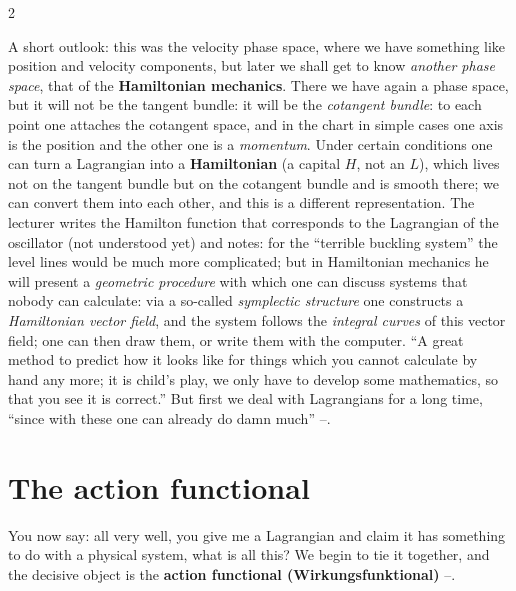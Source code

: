 \begin{paracol}{2}
\begin{aside}\label{as:lag-hamilton}
A short outlook: this was the velocity phase space, where we have something like position and velocity components, but later we shall get to know \emph{another phase space}, that of the \textbf{Hamiltonian mechanics}. There we have again a phase space, but it will not be the tangent bundle: it will be the \emph{cotangent bundle}: to each point one attaches the cotangent space, and in the chart in simple cases one axis is the position and the other one is a \emph{momentum}. Under certain conditions one can turn a Lagrangian into a \textbf{Hamiltonian} (a capital $H$, not an $L$), which lives not on the tangent bundle but on the cotangent bundle and is smooth there; we can convert them into each other, and this is a different representation.
The lecturer writes the Hamilton function that corresponds to the Lagrangian of the oscillator (not understood yet) and notes: for the ``terrible buckling system'' the level lines would be much more complicated; but in Hamiltonian mechanics he will present a \emph{geometric procedure} with which one can discuss systems that nobody can calculate: via a so-called \emph{symplectic structure} one constructs a \emph{Hamiltonian vector field}, and the system follows the \emph{integral curves} of this vector field; one can then draw them, or write them with the computer. ``A great method to predict how it looks like for things which you cannot calculate by hand any more; it is child's play, we only have to develop some mathematics, so that you see it is correct.'' But first we deal with Lagrangians for a long time, ``since with these one can already do damn much'' --.
\end{aside}

\section{The action functional}\label{sec:lag-action}

You now say: all very well, you give me a Lagrangian and claim it has something to do with a physical system, what is all this? We begin to tie it together, and the decisive object is the \textbf{action functional (Wirkungsfunktional)} --.


\end{paracol}
